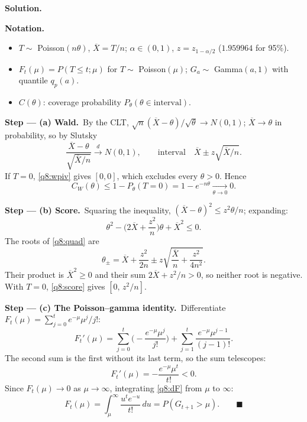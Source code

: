 \documentclass[11pt,a4paper]{article}
\numberwithin{equation}{questao}   %
\newenvironment{notacao}{\par\smallskip\noindent\textbf{Notation.}\begin{itemize}[leftmargin=1.4em,topsep=1pt,itemsep=0pt]\small}{\end{itemize}}
\newcommand{\passo}[2]{\par\smallskip\noindent\textbf{Step --- #1.}~#2}
\newcommand{\solhead}{\par\medskip\noindent{\color{blue!55!black}\rule{\linewidth}{0.3pt}}\par\noindent\textbf{Solution.}}
\newcommand{\1}{\mathbf{1}}
\begin{document}
\begin{sol}
\solhead
\begin{notacao}
\item $T\sim$ Poisson$(n\theta)$, $\overline X=T/n$; $\alpha\in(0,1)$, $z=z_{1-\alpha/2}$ ($1.959964$ for 95\%).
\item $F_t(\mu)=P(T\le t;\mu)$ for $T\sim$ Poisson$(\mu)$; $G_a\sim$ Gamma$(a,1)$ with quantile $q_p(a)$.
\item $C(\theta)$: coverage probability $P_\theta(\theta\in\text{interval})$.
\end{notacao}

\passo{(a) Wald}{By the CLT, $\sqrt n(\overline X-\theta)/\sqrt\theta\to N(0,1)$; $\overline X\to\theta$ in
probability, so by Slutsky}
\begin{equation}\label{q8:wpiv}
\frac{\overline X-\theta}{\sqrt{\overline X/n}}\xrightarrow{d}N(0,1),
\qquad\text{interval}\quad \overline X\pm z\sqrt{\overline X/n}.
\end{equation}
If $T=0$, \eqref{q8:wpiv} gives $[0,0]$, which excludes every $\theta>0$. Hence
\begin{equation}\label{q8:wcov}
C_{W}(\theta)\le1-P_\theta(T=0)=1-e^{-n\theta}\xrightarrow[\theta\to0]{}0 .
\end{equation}

\passo{(b) Score}{Squaring the inequality, $(\overline X-\theta)^2\le z^2\theta/n$; expanding:}
\begin{equation}\label{q8:quad}
\theta^2-\Big(2\overline X+\frac{z^2}{n}\Big)\theta+\overline X^2\le0 .
\end{equation}
The roots of \eqref{q8:quad} are
\begin{equation}\label{q8:score}
\theta_\pm=\overline X+\frac{z^2}{2n}\pm z\sqrt{\frac{\overline X}{n}+\frac{z^2}{4n^2}} .
\end{equation}
Their product is $\overline X^2\ge0$ and their sum $2\overline X+z^2/n>0$, so neither root is
negative. With $T=0$, \eqref{q8:score} gives $[0,\,z^2/n]$.

\passo{(c) The Poisson--gamma identity}{Differentiate $F_t(\mu)=\sum_{j=0}^te^{-\mu}\mu^j/j!$:}
\[
F_t'(\mu)=\sum_{j=0}^t\Big(-\frac{e^{-\mu}\mu^j}{j!}\Big)+\sum_{j=1}^t\frac{e^{-\mu}\mu^{j-1}}{(j-1)!}.
\]
The second sum is the first without its last term, so the sum telescopes:
\begin{equation}\label{q8:dF}
F_t'(\mu)=-\frac{e^{-\mu}\mu^t}{t!}<0 .
\end{equation}
Since $F_t(\mu)\to0$ as $\mu\to\infty$, integrating \eqref{q8:dF} from $\mu$ to $\infty$:
\begin{equation}\label{q8:id}
F_t(\mu)=\int_\mu^\infty\frac{u^te^{-u}}{t!}\,du=P(G_{t+1}>\mu). \qquad\blacksquare
\end{equation}


\end{sol}
\end{document}
